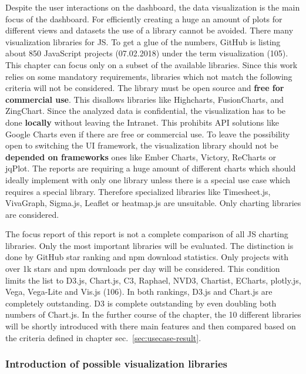 \documentclass[american,a4paper,oneside,,tablecaptionabove]{scrbook}
\begin{document}
Despite the user interactions on the dashboard, the data visualization
is the main focus of the dashboard. For efficiently creating a huge an
amount of plots for different views and datasets the use of a library
cannot be avoided. There many visualization libraries for JS. To get a
glue of the numbers, GitHub is listing about 850 JavaScript projects
(07.02.2018) under the term visualization (105). This chapter can focus
only on a subset of the available libraries. Since this work relies on
some mandatory requirements, libraries which not match the following
criteria will not be considered. The library must be open source and
\textbf{free for commercial use}. This disallows libraries like
Highcharts, FusionCharts, and ZingChart. Since the analyzed data is
confidential, the visualization has to be done \textbf{locally} without
leaving the Intranet. This prohibits API solutions like Google Charts
even if there are free or commercial use. To leave the possibility open
to switching the UI framework, the visualization library should not be
\textbf{depended on frameworks} ones like Ember Charts, Victory,
ReCharts or jqPlot. The reports are requiring a huge amount of different
charts which should ideally implement with only one library unless there
is a special use case which requires a special library. Therefore
specialized libraries like Timesheet.js, VivaGraph, Sigma.js, Leaflet or
heatmap.js are unsuitable. Only charting libraries are considered.

The focus report of this report is not a complete comparison of all JS
charting libraries. Only the most important libraries will be evaluated.
The distinction is done by GitHub star ranking and npm download
statistics. Only projects with over 1k stars and npm downloads per day
will be considered. This condition limits the list to D3.js, Chart.js,
C3, Raphael, NVD3, Chartist, ECharts, plotly.js, Vega, Vega-Lite and
Vis.js (106). In both rankings, D3.js and Chart.js are completely
outstanding. D3 is complete outstanding by even doubling both numbers of
Chart.js. In the further course of the chapter, the 10 different
libraries will be shortly introduced with there main features and then
compared based on the criteria defined in chapter
sec.~\ref{sec:usecase-result}.

\subsubsection{Introduction of possible visualization
libraries}\label{introduction-of-possible-visualization-libraries}
\end{document}

